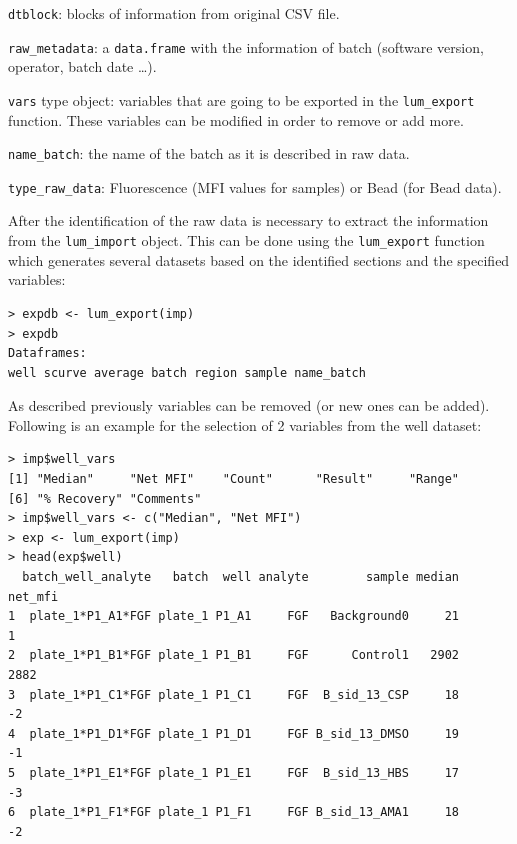 \documentclass[11pt]{article}\usepackage[]{graphicx}\usepackage[]{color}
\makeatletter
\newenvironment{kframe}{%
 \def\at@end@of@kframe{}%
 \ifinner\ifhmode%
  \def\at@end@of@kframe{\end{minipage}}%
  \begin{minipage}{\columnwidth}%
 \fi\fi%
 \def\FrameCommand##1{\hskip\@totalleftmargin \hskip-\fboxsep
 \colorbox{shadecolor}{##1}\hskip-\fboxsep
     \hskip-\linewidth \hskip-\@totalleftmargin \hskip\columnwidth}%
 \MakeFramed {\advance\hsize-\width
   \@totalleftmargin\z@ \linewidth\hsize
   \@setminipage}}%
 {\par\unskip\endMakeFramed%
 \at@end@of@kframe}
\newenvironment{knitrout}{}{} %
\newenvironment{itemize*}%
    {\begin{itemize}%
        \setlength{\itemsep}{-0.35cm}%
        \setlength{\parskip}{10pt}}%
{\end{itemize}}
\makeatother
\begin{document}
\begin{itemize*}
    \item {\tt dtblock}: blocks of information from original CSV file.
    \item {\tt raw\_metadata}: a {\tt data.frame} with the information 
    of batch (software version, operator, batch date  \ldots). 
    \item {\tt vars} type object: variables that are going to be 
    exported in the {\tt lum\_export} function. These variables can 
    be modified in order to remove or add more. 
    \item {\tt name\_batch}: the name of the batch as it is described 
    in raw data.
    \item {\tt type\_raw\_data}: Fluorescence (MFI values for samples) 
    or Bead (for Bead data).
\end{itemize*}

\noindent After the identification of the raw data is necessary to 
extract the information from the {\tt lum\_import} object. This 
can be done using the {\tt lum\_export} function which generates several 
datasets based on the identified sections and the specified variables:


\begin{knitrout}
\color{fgcolor}\begin{kframe}
\begin{verbatim}
> expdb <- lum_export(imp)
> expdb
Dataframes: 
well scurve average batch region sample name_batch
\end{verbatim}
\end{kframe}
\end{knitrout}

\noindent As described previously variables can be removed  
(or new ones can be added). Following is an example for the selection of 2 
variables from the well dataset:

\begin{knitrout}
\color{fgcolor}\begin{kframe}
\begin{verbatim}
> imp$well_vars
[1] "Median"     "Net MFI"    "Count"      "Result"     "Range"     
[6] "% Recovery" "Comments"  
> imp$well_vars <- c("Median", "Net MFI")
> exp <- lum_export(imp)
> head(exp$well)
  batch_well_analyte   batch  well analyte        sample median net_mfi
1  plate_1*P1_A1*FGF plate_1 P1_A1     FGF   Background0     21       1
2  plate_1*P1_B1*FGF plate_1 P1_B1     FGF      Control1   2902    2882
3  plate_1*P1_C1*FGF plate_1 P1_C1     FGF  B_sid_13_CSP     18      -2
4  plate_1*P1_D1*FGF plate_1 P1_D1     FGF B_sid_13_DMSO     19      -1
5  plate_1*P1_E1*FGF plate_1 P1_E1     FGF  B_sid_13_HBS     17      -3
6  plate_1*P1_F1*FGF plate_1 P1_F1     FGF B_sid_13_AMA1     18      -2
\end{verbatim}
\end{kframe}
\end{knitrout}
\end{document}
